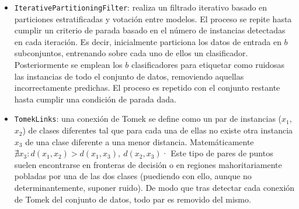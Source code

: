\documentclass[print, color]{ugrTFG}
\begin{document}
\begin{itemize}
    
    \item \texttt{IterativePartitioningFilter}: realiza un filtrado iterativo basado en particiones estratificadas y votación entre modelos. El proceso se repite hasta cumplir un criterio de parada basado en el número de instancias detectadas en cada iteración. Es decir, inicialmente particiona los datos de entrada en $b$ subconjuntos, entrenando sobre cada uno de ellos un clasificador. Posteriormente se emplean los $b$ clasificadores para etiquetar como ruidosas las instancias de todo el conjunto de datos, removiendo aquellas incorrectamente predichas. El proceso es repetido con el conjunto restante hasta cumplir una condición de parada dada.
    
    \item \texttt{TomekLinks}: una conexión de Tomek se define como un par de instancias ($x_1$,$x_2$) de clases diferentes tal que para cada una de ellas no existe otra instancia $x_3$ de una clase diferente a una menor distancia. Matemáticamente $\nexists x_3 : d(x_1,x_2)> d(x_1,x_3),\ d(x_2,x_3)$· Este tipo de pares de puntos suelen encontrarse en fronteras de decisión o en regiones mahoritariamente pobladas por una de las dos clases (puediendo con ello, aunque no determinantemente, suponer ruido). De modo que tras detectar cada conexión de Tomek del conjunto de datos, todo par es removido del mismo. 
    
 \end{itemize}
\end{document}
